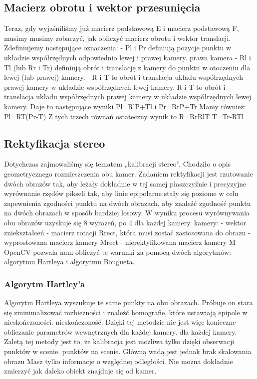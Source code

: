 \documentclass[magisterska]{pracadypl}
\begin{document}
\subsection{Macierz obrotu i wektor przesunięcia}

Teraz, gdy wyjaśniliśmy już macierz podstawową E i macierz podstawową F, musimy
musimy zobaczyć, jak obliczyć macierz obrotu i wektor translacji.
Zdefiniujemy następujące oznaczenia:
- Pl i Pr definiują pozycje punktu w układzie współrzędnych odpowiednio lewej i prawej kamery.
prawa kamera
- Rl i Tl (lub Rr i Tr) definiują obrót i translację z kamery
do punktu w otoczeniu dla lewej (lub prawej) kamery.
- R i T to obrót i translacja układu współrzędnych prawej kamery w układzie współrzędnych lewej kamery.
R i T to obrót i translacja układu współrzędnych prawej kamery w układzie współrzędnych lewej kamery.
Daje to następujące wyniki
Pl=RlP+Tl i Pr=RrP+Tr
Mamy również:
Pl=RT(Pr-T)
Z tych trzech równań ostateczny wynik to
R=RrRlT
T=Tr-RTl

\subsection{Rektyfikacja stereo}

Dotychczas zajmowaliśmy się tematem „kalibracji stereo”. Chodziło o
opis geometrycznego rozmieszczenia obu kamer. Zadaniem
rektyfikacji jest rzutowanie dwóch obrazów tak, aby leżały dokładnie w tej samej płaszczyźnie i precyzyjne wyrównanie rzędów pikseli tak, aby linie epipolarne stały się poziome w celu zapewnienia zgodności punktu na dwóch obrazach.
aby znaleźć zgodność punktu na dwóch obrazach w sposób bardziej losowy.
W wyniku procesu wyrównywania obu obrazów uzyskuje się 8 wyrażeń, po 4 dla każdej kamery.
kamery:
- wektor zniekształceń
- macierz rotacji Rrect, która musi zostać zastosowana do obrazu
- wyprostowana macierz kamery Mrect
- nierektyfikowana macierz kamery M
OpenCV pozwala nam obliczyć te warunki za pomocą dwóch algorytmów: algorytmu Hartleya
i algorytmu Bougueta.

\subsubsection{Algorytm Hartley'a}

Algorytm Hartleya wyszukuje te same punkty na obu obrazach. Próbuje on
stara się zminimalizować rozbieżności i znaleźć homografie, które ustawiają epipole w nieskończoności.
nieskończoność. Dzięki tej metodzie nie jest więc konieczne obliczanie parametrów wewnętrznych dla każdej kamery.
dla każdej kamery.
Zaletą tej metody jest to, że kalibracja jest możliwa tylko dzięki obserwacji punktów w scenie.
punktów na scenie. Główną wadą jest jednak brak skalowania obrazu
Masz tylko informacje o względnej odległości. Nie można dokładnie zmierzyć
jak daleko obiekt znajduje się od kamer.
\end{document}
